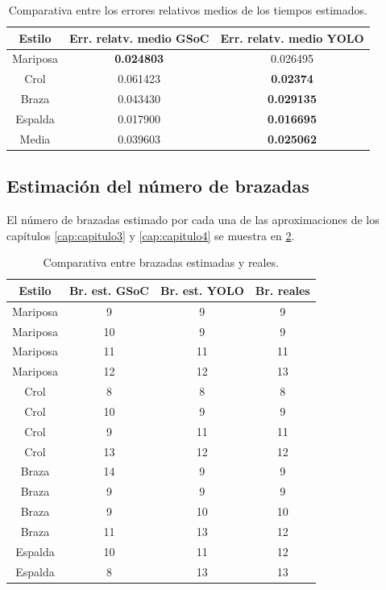 \begin{table}[]
    \centering
    \small
    \begin{tabular}{|c|c|c|} \hline
         Estilo & Err. relatv. medio GSoC & Err. relatv. medio YOLO  \\ \hline
         Mariposa & \textbf{0.024803} & 0.026495 \\
         Crol & 0.061423 & \textbf{0.02374}  \\   
         Braza & 0.043430 & \textbf{0.029135} \\
         Espalda & 0.017900 & \textbf{0.016695} \\
         Media & 0.039603 & \textbf{0.025062} \\ \hline
    \end{tabular}
    \caption{Comparativa entre los errores relativos medios de los tiempos estimados.}
    \label{tab:tablatiemposmedioscap5}
\end{table} 

\subsection{Estimación del número de brazadas }
El número de brazadas estimado por cada una de las aproximaciones de los capítulos \ref{cap:capitulo3} y \ref{cap:capitulo4} se muestra en \ref{tab:tablabrazadascap5}.

\begin{table}[]
    \centering
    \small
    \begin{tabular}{|c|c|c|c|} \hline
         Estilo & Br. est. GSoC & Br. est. YOLO & Br. reales  \\ \hline
         Mariposa & 9 & 9 & 9  \\   
         Mariposa & 10 & 9 & 9 \\
         Mariposa & 11 & 11 & 11 \\
         Mariposa & 12 & 12 & 13 \\
         Crol & 8 & 8 & 8  \\
         Crol & 10 & 9 & 9 \\
         Crol & 9 & 11 & 11 \\  
         Crol & 13 & 12 & 12 \\
         Braza & 14 & 9 & 9 \\  
         Braza & 9 & 9 & 9 \\
         Braza & 9 & 10 & 10  \\
         Braza & 11 & 13 & 12  \\
         Espalda & 10 & 11 & 12 \\
         Espalda & 8 & 13 & 13 \\ \hline
    \end{tabular}
    \caption{Comparativa entre brazadas estimadas y reales.}
    \label{tab:tablabrazadascap5}
\end{table}


